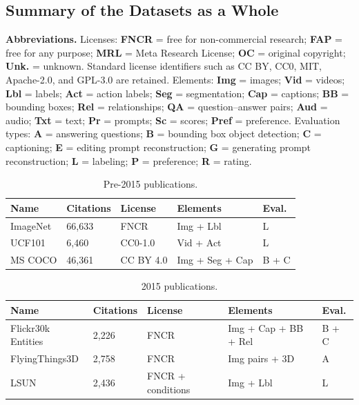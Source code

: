 \documentclass{article}
\begin{document}
\subsection{Summary of the Datasets as a Whole}

\noindent\textbf{Abbreviations.}
Licenses: \textbf{FNCR} = free for non-commercial research; \textbf{FAP} = free for any purpose; \textbf{MRL} = Meta Research License; \textbf{OC} = original copyright; \textbf{Unk.} = unknown. Standard license identifiers such as CC BY, CC0, MIT, Apache-2.0, and GPL-3.0 are retained.
Elements: \textbf{Img} = images; \textbf{Vid} = videos; \textbf{Lbl} = labels; \textbf{Act} = action labels; \textbf{Seg} = segmentation; \textbf{Cap} = captions; \textbf{BB} = bounding boxes; \textbf{Rel} = relationships; \textbf{QA} = question--answer pairs; \textbf{Aud} = audio; \textbf{Txt} = text; \textbf{Pr} = prompts; \textbf{Sc} = scores; \textbf{Pref} = preference.
Evaluation types: \textbf{A} = answering questions; \textbf{B} = bounding box object detection; \textbf{C} = captioning; \textbf{E} = editing prompt reconstruction; \textbf{G} = generating prompt reconstruction; \textbf{L} = labeling; \textbf{P} = preference; \textbf{R} = rating.


\begin{table}[H]
\centering
\caption{Pre-2015 publications.}
\label{tab:datasets}
\begin{tabular}{p{2.5cm}p{1.65cm}p{3.05cm}p{3.2cm}p{2.15cm}}
\hline
\textbf{Name} & \textbf{Citations} & \textbf{License} & \textbf{Elements} & \textbf{Eval.}\\
\hline
ImageNet & 66,633 & FNCR & Img + Lbl & L\\
\hline
UCF101 & 6,460 & CC0-1.0 & Vid + Act & L\\
\hline
MS COCO & 46,361 & CC BY 4.0 & Img + Seg + Cap & B + C\\
\hline

\end{tabular}
\end{table}

\begin{table}[H]
\centering
\caption{2015 publications.}
\begin{tabular}{p{2.5cm}p{1.65cm}p{3.05cm}p{3.2cm}p{2.15cm}}
\hline
\textbf{Name} & \textbf{Citations} & \textbf{License} & \textbf{Elements} & \textbf{Eval.}\\
\hline
Flickr30k Entities & 2,226 & FNCR & Img + Cap + BB + Rel & B + C\\
\hline
FlyingThings3D & 2,758 & FNCR & Img pairs + 3D & A\\
\hline
LSUN & 2,436 & FNCR + conditions & Img + Lbl & L\\
\hline

\end{tabular}
\end{table}
\end{document}
